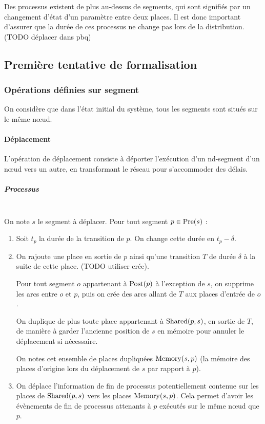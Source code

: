 Des processus existent de plus au-dessus de segments, qui sont signifiés par un changement d'état d'un paramètre entre deux places. Il est donc important d'assurer que la durée de ces processus ne change pas lors de la distribution. (TODO déplacer dans pbq)

\subsection{Première tentative de formalisation}
\subsubsection{Opérations définies sur segment}
On considère que dans l'état initial du système, tous les segments sont situés sur le même nœud.

\paragraph{Déplacement}
L'opération de déplacement consiste à déporter l'exécution d'un nd-segment d'un nœud vers un autre, en transformant le réseau pour s'accommoder des délais.

\subparagraph{Processus} ~ \\

On note $s$ le segment à déplacer.
Pour tout segment $p \in \operatorname{Pre}(s)$ : 

\begin{enumerate}
\item Soit $t_p$ la durée de la transition de $p$. On change cette durée en $t_p - \delta$.
\item On rajoute une place en sortie de $p$ ainsi qu'une transition $T$ de durée $\delta$ à la suite de cette place. (TODO utiliser crée).

Pour tout segment $o$ appartenant à $\operatorname{Post}(p)$ à l'exception de $s$, on supprime les arcs entre $o$ et $p$, puis on crée des arcs allant de $T$ aux places d'entrée de $o$.

On duplique de plus toute place appartenant à $\operatorname{Shared}(p, s)$, en sortie de $T$, de manière à garder l'ancienne position de $s$ en mémoire pour annuler le déplacement si nécessaire.

On notes cet ensemble de places dupliquées $\operatorname{Memory}(s, p)$ (la mémoire des places d'origine lors du déplacement de $s$ par rapport à $p$).
 
\item On déplace l'information de fin de processus potentiellement contenue sur les places de $\operatorname{Shared}(p, s)$ vers les places  $\operatorname{Memory}(s, p)$. Cela permet d'avoir les évènements de fin de processus attenants à $p$ exécutés sur le même nœud que $p$.
\end{enumerate}

